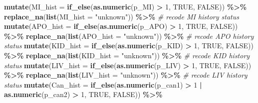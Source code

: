 \documentclass[
]{article}
\newenvironment{Shaded}{\begin{snugshade}}{\end{snugshade}}
\newcommand{\CommentTok}[1]{\textcolor[rgb]{0.56,0.35,0.01}{\textit{#1}}}
\newcommand{\DataTypeTok}[1]{\textcolor[rgb]{0.13,0.29,0.53}{#1}}
\newcommand{\DecValTok}[1]{\textcolor[rgb]{0.00,0.00,0.81}{#1}}
\newcommand{\KeywordTok}[1]{\textcolor[rgb]{0.13,0.29,0.53}{\textbf{#1}}}
\newcommand{\NormalTok}[1]{#1}
\newcommand{\OperatorTok}[1]{\textcolor[rgb]{0.81,0.36,0.00}{\textbf{#1}}}
\newcommand{\OtherTok}[1]{\textcolor[rgb]{0.56,0.35,0.01}{#1}}
\newcommand{\StringTok}[1]{\textcolor[rgb]{0.31,0.60,0.02}{#1}}
\begin{document}
\begin{Shaded}
\begin{Highlighting}[]
\StringTok{  }\KeywordTok{mutate}\NormalTok{(}\DataTypeTok{MI\_hist =} \KeywordTok{if\_else}\NormalTok{(}\KeywordTok{as.numeric}\NormalTok{(p\_MI) }\OperatorTok{\textgreater{}}\StringTok{ }\DecValTok{1}\NormalTok{, }\OtherTok{TRUE}\NormalTok{, }\OtherTok{FALSE}\NormalTok{)) }\OperatorTok{\%\textgreater{}\%}\StringTok{ }
\StringTok{  }\KeywordTok{replace\_na}\NormalTok{(}\KeywordTok{list}\NormalTok{(}\DataTypeTok{MI\_hist =} \StringTok{"unknown"}\NormalTok{)) }\OperatorTok{\%\textgreater{}\%}\StringTok{ }\CommentTok{\# recode MI history status}
\StringTok{  }\KeywordTok{mutate}\NormalTok{(}\DataTypeTok{APO\_hist =} \KeywordTok{if\_else}\NormalTok{(}\KeywordTok{as.numeric}\NormalTok{(p\_APO) }\OperatorTok{\textgreater{}}\StringTok{ }\DecValTok{1}\NormalTok{, }\OtherTok{TRUE}\NormalTok{, }\OtherTok{FALSE}\NormalTok{)) }\OperatorTok{\%\textgreater{}\%}\StringTok{ }
\StringTok{  }\KeywordTok{replace\_na}\NormalTok{(}\KeywordTok{list}\NormalTok{(}\DataTypeTok{APO\_hist =} \StringTok{"unknown"}\NormalTok{)) }\OperatorTok{\%\textgreater{}\%}\StringTok{ }\CommentTok{\# recode APO history status}
\StringTok{  }\KeywordTok{mutate}\NormalTok{(}\DataTypeTok{KID\_hist =} \KeywordTok{if\_else}\NormalTok{(}\KeywordTok{as.numeric}\NormalTok{(p\_KID) }\OperatorTok{\textgreater{}}\StringTok{ }\DecValTok{1}\NormalTok{, }\OtherTok{TRUE}\NormalTok{, }\OtherTok{FALSE}\NormalTok{)) }\OperatorTok{\%\textgreater{}\%}\StringTok{ }
\StringTok{  }\KeywordTok{replace\_na}\NormalTok{(}\KeywordTok{list}\NormalTok{(}\DataTypeTok{KID\_hist =} \StringTok{"unknown"}\NormalTok{)) }\OperatorTok{\%\textgreater{}\%}\StringTok{ }\CommentTok{\# recode KID history status}
\StringTok{  }\KeywordTok{mutate}\NormalTok{(}\DataTypeTok{LIV\_hist =} \KeywordTok{if\_else}\NormalTok{(}\KeywordTok{as.numeric}\NormalTok{(p\_LIV) }\OperatorTok{\textgreater{}}\StringTok{ }\DecValTok{1}\NormalTok{, }\OtherTok{TRUE}\NormalTok{, }\OtherTok{FALSE}\NormalTok{)) }\OperatorTok{\%\textgreater{}\%}\StringTok{ }
\StringTok{  }\KeywordTok{replace\_na}\NormalTok{(}\KeywordTok{list}\NormalTok{(}\DataTypeTok{LIV\_hist =} \StringTok{"unknown"}\NormalTok{)) }\OperatorTok{\%\textgreater{}\%}\StringTok{ }\CommentTok{\# recode LIV history status}
\StringTok{  }\KeywordTok{mutate}\NormalTok{(}\DataTypeTok{Can\_hist =} \KeywordTok{if\_else}\NormalTok{(}\KeywordTok{as.numeric}\NormalTok{(p\_can1) }\OperatorTok{\textgreater{}}\StringTok{ }\DecValTok{1} \OperatorTok{|}\StringTok{ }
\StringTok{                              }\KeywordTok{as.numeric}\NormalTok{(p\_can2) }\OperatorTok{\textgreater{}}\StringTok{ }\DecValTok{1}\NormalTok{, }\OtherTok{TRUE}\NormalTok{, }\OtherTok{FALSE}\NormalTok{)) }\OperatorTok{\%\textgreater{}\%}\StringTok{ }

\end{Highlighting}
\end{Shaded}
\end{document}
